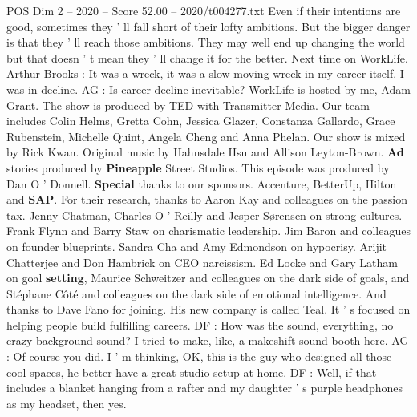 \begin{textsample}{POS Dim 2 – 2020 – Score 52.00 – 2020/t004277.txt}
Even if their intentions are good, sometimes they ' ll fall short of their lofty ambitions.
But the bigger danger is that they ' ll reach those ambitions.
They may well end up changing the world but that doesn ' t mean they ' ll change it for the better.
Next time on WorkLife.
Arthur Brooks : It was a wreck, it was a slow moving wreck in my career itself.
I was in decline.
AG : Is career decline inevitable?
WorkLife is hosted by me, Adam Grant.
The show is produced by TED with Transmitter Media.
Our team includes Colin Helms, Gretta Cohn, Jessica Glazer, Constanza Gallardo, Grace Rubenstein, Michelle Quint, Angela Cheng and Anna Phelan.
Our show is mixed by Rick Kwan.
Original music by Hahnsdale Hsu and Allison Leyton-Brown. \textbf{Ad} stories produced by \textbf{Pineapple} Street Studios.
This episode was produced by Dan O ' Donnell. \textbf{Special} thanks to our sponsors.
Accenture, BetterUp, Hilton and \textbf{SAP}.
For their research, thanks to Aaron Kay and colleagues on the passion tax.
Jenny Chatman, Charles O ' Reilly and Jesper Sørensen on strong cultures.
Frank Flynn and Barry Staw on charismatic leadership.
Jim Baron and colleagues on founder blueprints.
Sandra Cha and Amy Edmondson on hypocrisy.
Arijit Chatterjee and Don Hambrick on CEO narcissism.
Ed Locke and Gary Latham on goal \textbf{setting}, Maurice Schweitzer and colleagues on the dark side of goals, and Stéphane Côté and colleagues on the dark side of emotional intelligence.
And thanks to Dave Fano for joining.
His new company is called Teal.
It ' s focused on helping people build fulfilling careers.
DF : How was the sound, everything, no crazy background sound?
I tried to make, like, a makeshift sound booth here.
AG : Of course you did.
I ' m thinking, OK, this is the guy who designed all those cool spaces, he better have a great studio setup at home.
DF : Well, if that includes a blanket hanging from a rafter and my daughter ' s purple headphones as my headset, then yes.

\end{textsample}
